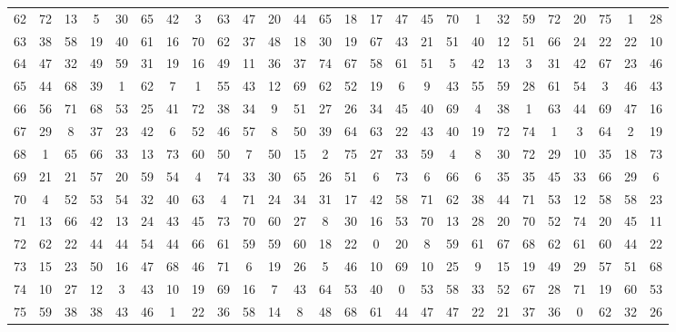 \begin{table}
\begin{tabular}{c c c c c c c c c c c c c c c c c c c c c c c c c c }
62 & 72 & 13 & 5 & 30 & 65 & 42 & 3 & 63 & 47 & 20 & 44 & 65 & 18 & 17 & 47 & 45 & 70 & 1 & 32 & 59 & 72 & 20 & 75 & 1 & 28 \\
63 & 38 & 58 & 19 & 40 & 61 & 16 & 70 & 62 & 37 & 48 & 18 & 30 & 19 & 67 & 43 & 21 & 51 & 40 & 12 & 51 & 66 & 24 & 22 & 22 & 10 \\
64 & 47 & 32 & 49 & 59 & 31 & 19 & 16 & 49 & 11 & 36 & 37 & 74 & 67 & 58 & 61 & 51 & 5 & 42 & 13 & 3 & 31 & 42 & 67 & 23 & 46 \\
65 & 44 & 68 & 39 & 1 & 62 & 7 & 1 & 55 & 43 & 12 & 69 & 62 & 52 & 19 & 6 & 9 & 43 & 55 & 59 & 28 & 61 & 54 & 3 & 46 & 43 \\
66 & 56 & 71 & 68 & 53 & 25 & 41 & 72 & 38 & 34 & 9 & 51 & 27 & 26 & 34 & 45 & 40 & 69 & 4 & 38 & 1 & 63 & 44 & 69 & 47 & 16 \\
67 & 29 & 8 & 37 & 23 & 42 & 6 & 52 & 46 & 57 & 8 & 50 & 39 & 64 & 63 & 22 & 43 & 40 & 19 & 72 & 74 & 1 & 3 & 64 & 2 & 19 \\
68 & 1 & 65 & 66 & 33 & 13 & 73 & 60 & 50 & 7 & 50 & 15 & 2 & 75 & 27 & 33 & 59 & 4 & 8 & 30 & 72 & 29 & 10 & 35 & 18 & 73 \\
69 & 21 & 21 & 57 & 20 & 59 & 54 & 4 & 74 & 33 & 30 & 65 & 26 & 51 & 6 & 73 & 6 & 66 & 6 & 35 & 35 & 45 & 33 & 66 & 29 & 6 \\
70 & 4 & 52 & 53 & 54 & 32 & 40 & 63 & 4 & 71 & 24 & 34 & 31 & 17 & 42 & 58 & 71 & 62 & 38 & 44 & 71 & 53 & 12 & 58 & 58 & 23 \\
71 & 13 & 66 & 42 & 13 & 24 & 43 & 45 & 73 & 70 & 60 & 27 & 8 & 30 & 16 & 53 & 70 & 13 & 28 & 20 & 70 & 52 & 74 & 20 & 45 & 11 \\
72 & 62 & 22 & 44 & 44 & 54 & 44 & 66 & 61 & 59 & 59 & 60 & 18 & 22 & 0 & 20 & 8 & 59 & 61 & 67 & 68 & 62 & 61 & 60 & 44 & 22 \\
73 & 15 & 23 & 50 & 16 & 47 & 68 & 46 & 71 & 6 & 19 & 26 & 5 & 46 & 10 & 69 & 10 & 25 & 9 & 15 & 19 & 49 & 29 & 57 & 51 & 68 \\
74 & 10 & 27 & 12 & 3 & 43 & 10 & 19 & 69 & 16 & 7 & 43 & 64 & 53 & 40 & 0 & 53 & 58 & 33 & 52 & 67 & 28 & 71 & 19 & 60 & 53 \\
75 & 59 & 38 & 38 & 43 & 46 & 1 & 22 & 36 & 58 & 14 & 8 & 48 & 68 & 61 & 44 & 47 & 47 & 22 & 21 & 37 & 36 & 0 & 62 & 32 & 26 \\
\hline
\end{tabular}
\end{table}